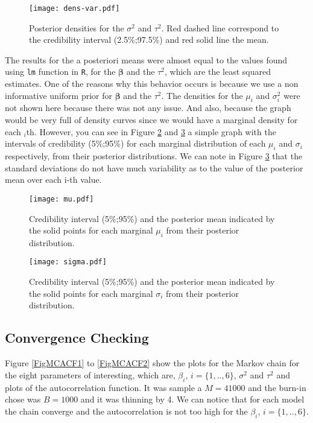 \documentclass{asaproc}
\begin{document}
\begin{figure}[H]
\centering
\texttt{[image: dens-var.pdf]}
\caption{Posterior densities for the $\sigma^2$ and $\tau^2$. Red dashed line correspond to the credibility interval (2.5\%;97.5\%) and red solid line the mean.}
\label{FigDM2}
\end{figure}

The results for the a posteriori means were almost equal to the values found using \texttt{lm} function in \texttt{R}, for the $\boldsymbol{\beta}$ and the $\tau^2$, which are the least squared estimates. One of the reasons why this behavior occurs is because we use a non informative uniform prior for $\boldsymbol{\beta}$ and the $\tau^2$. The densities for the $\mu_i$ and $\sigma^2_i$ were not shown here because there was not any issue. And also, because the graph would be very full of density curves since we would have a marginal density for each $_i$th. However, you can see in Figure \ref{mu} and \ref{sigma} a simple graph with the intervals of credibility (5\%;95\%) for each marginal distribution of each $\mu_i$ and $\sigma_i$ respectively, from their posterior distributions. We can note in Figure \ref{sigma} that the standard deviations do not have much variability as to the value of the posterior mean over each i-th value.

\begin{figure}[H]
\centering
\texttt{[image: mu.pdf]}
\caption{Credibility interval (5\%;95\%) and the posterior mean indicated by the solid points for each marginal $\mu_i$ from their posterior distribution.}
\label{mu}
\end{figure}


\begin{figure}[H]
\centering
\texttt{[image: sigma.pdf]}
\caption{Credibility interval (5\%;95\%) and the posterior mean indicated by the solid points for each marginal $\sigma_i$ from their posterior distribution.}
\label{sigma}
\end{figure}

\subsection{Convergence Checking}\label{convergence}

Figure \ref{FigMCACF1} to \ref{FigMCACF2} show the plots for the Markov chain for the eight parameters of interesting, which are, $\beta_i$, $i=\{1, .., 6 \}$, $\sigma^2$ and $\tau^2$ and plots of the autocorrelation function. It was sample a $M = 41000$ and the burn-in chose was $B = 1000$ and it was thinning by 4. We can notice that for each model the chain converge and the autocorrelation is not too high for the  $\beta_i$, $i=\{1, .., 6 \}$. 
\end{document}
